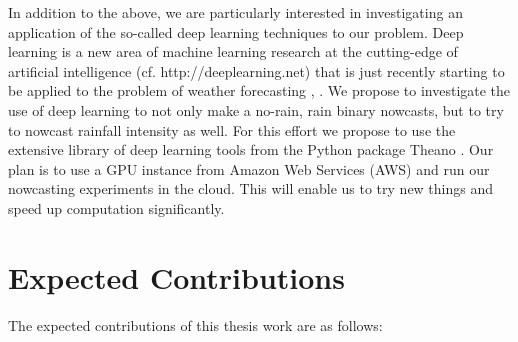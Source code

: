 \documentclass[proposal]{umassthesis}
\begin{document}
{In addition to the above, we are particularly interested in investigating an application of the so-called deep learning techniques to our problem. Deep learning is a new area of machine learning research at the cutting-edge of artificial intelligence (cf. http://deeplearning.net) that is just recently starting to be applied to the problem of weather forecasting \cite{shi2015convolutional}, \cite{grover2015deep}. We propose to investigate the use of deep learning to not only make a no-rain, rain binary nowcasts, but to try to nowcast rainfall intensity as well. For this effort we propose to use the extensive library of deep learning tools from the Python package Theano \cite{bergstra+al:2010-scipy}. Our plan is to use a GPU instance from Amazon Web Services (AWS) and run our nowcasting experiments in the cloud. This will enable us to try new things and speed up computation significantly.

\section{Expected Contributions}

The expected contributions of this thesis work are as follows: 

}
\end{document}
